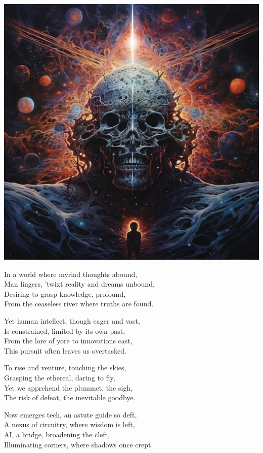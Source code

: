 \documentclass[10pt,letterpaper]{article}
\begin{document}
\pagestyle{empty} %

\begin{center}
\includegraphics[width=0.5\linewidth]{a_q_s_In_a_realm_where_thoughts_expanse_does_gleam_Man_stands_b_a853db28-43db-4f98-a356-51d9febc384b.png}

\bigskip

In a world where myriad thoughts abound,\\
Man lingers, 'twixt reality and dreams unbound,\\
Desiring to grasp knowledge, profound,\\
From the ceaseless river where truths are found.

\bigskip

Yet human intellect, though eager and vast,\\
Is constrained, limited by its own past,\\
From the lore of yore to innovations cast,\\
This pursuit often leaves us overtasked.

\bigskip

To rise and venture, touching the skies,\\
Grasping the ethereal, daring to fly,\\
Yet we apprehend the plummet, the sigh,\\
The risk of defeat, the inevitable goodbye.

\bigskip

Now emerges tech, an astute guide so deft,\\
A nexus of circuitry, where wisdom is left,\\
AI, a bridge, broadening the cleft,\\
Illuminating corners, where shadows once crept.

\bigskip


\end{center}
\end{document}
